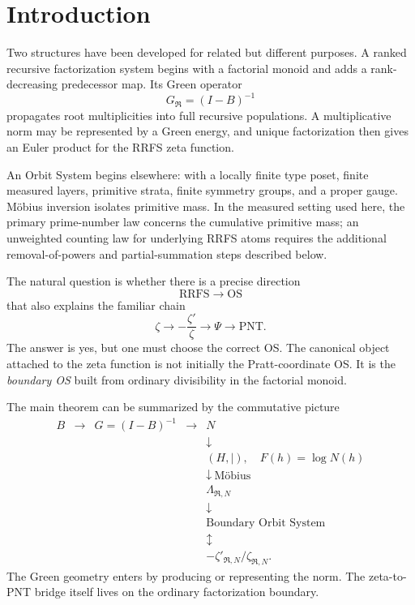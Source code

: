 \documentclass[11pt]{article}
\newcommand{\cR}{\mathfrak R}
\begin{document}
\section{Introduction}

Two structures have been developed for related but different purposes. A ranked recursive factorization system begins with a factorial monoid and adds a rank-decreasing predecessor map. Its Green operator
\[
G_{\cR}=(I-B)^{-1}
\]
propagates root multiplicities into full recursive populations. A multiplicative norm may be represented by a Green energy, and unique factorization then gives an Euler product for the RRFS zeta function.

An Orbit System begins elsewhere: with a locally finite type poset, finite measured layers, primitive strata, finite symmetry groups, and a proper gauge. M\"obius inversion isolates primitive mass. In the measured setting used here, the primary prime-number law concerns the cumulative primitive mass; an unweighted counting law for underlying RRFS atoms requires the additional removal-of-powers and partial-summation steps described below.

The natural question is whether there is a precise direction
\[
\boxed{\mathrm{RRFS}\longrightarrow\mathrm{OS}}
\]
that also explains the familiar chain
\[
\zeta\longrightarrow -\frac{\zeta'}{\zeta}\longrightarrow\Psi\longrightarrow \mathrm{PNT}.
\]
The answer is yes, but one must choose the correct OS. The canonical object attached to the zeta function is not initially the Pratt-coordinate OS. It is the \emph{boundary OS} built from ordinary divisibility in the factorial monoid.

The main theorem can be summarized by the commutative picture
\[
\boxed{
\begin{array}{ccccc}
B&\longrightarrow&G=(I-B)^{-1}&\longrightarrow&N\\
&&&&\downarrow\\
&&&&(H,\mid),\quad F(h)=\log N(h)\\
&&&&\downarrow\ \text{M\"obius}\\
&&&&\Lambda_{\cR,N}\\
&&&&\downarrow\\
&&&&\text{Boundary Orbit System}\\
&&&&\updownarrow\\[-1mm]
&&&&-\zeta'_{\cR,N}/\zeta_{\cR,N}.
\end{array}}
\]
The Green geometry enters by producing or representing the norm. The zeta-to-PNT bridge itself lives on the ordinary factorization boundary.
\end{document}
